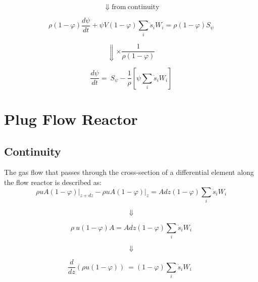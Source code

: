 \begin{equation*}
	\Downarrow \mathrm{from\: continuity}
\end{equation*}

\begin{equation*}
	\rho\left(1-\varphi\right)\frac{d\psi}{dt}
	+
	\psi V\left(1-\varphi\right)\sum_{i}{{\dot{s}}_iW_i}
	=
	\rho(1-\varphi)S_{\psi}
\end{equation*}

\begin{equation*}
	\Downarrow \times \frac{1}{\rho(1-\varphi)}
\end{equation*}

\begin{equation}
	\frac{d\psi}{dt}=\ S_{\psi}-\frac{1}{\rho}\left[\psi\sum_{i}{{\dot{s}}_iW_i}\right]
	\label{eqn:app_sootconstuv}
\end{equation}


\section{Plug Flow Reactor}
\label{sec:derivpfr}

\subsection{Continuity}
The gas flow that passes through the cross-section of a differential element along the flow reactor is described as:
\begin{equation*}
	{\rho uA\left(1-\varphi\right)|}_{z+dz}-{\rho uA\left(1-\varphi\right)|}_z
	=
	Adz(1-\varphi)\sum_{i}{{\dot{s}}_iW_i}
\end{equation*}

\begin{equation*}
	\Downarrow
\end{equation*}

\begin{equation*}
	\rho\ u(1-\varphi)A=Adz(1-\varphi)\sum_{i}{{\dot{s}}_iW_i}
\end{equation*}

\begin{equation*}
	\Downarrow
\end{equation*}

\begin{equation}
	\frac{d}{dz}\left(\rho u(1-\varphi)\right)\ =(1-\varphi)\sum_{i}{{\dot{s}}_iW_i}\ \ 
	\label{eqn:app_contpfr}
\end{equation}

